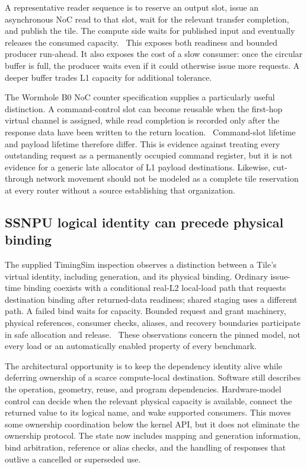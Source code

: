 A representative reader sequence is to reserve an output slot, issue an asynchronous NoC read to that slot, wait for the relevant transfer completion, and publish the tile. The compute side waits for published input and eventually releases the consumed capacity.~\citep{u001-metalium} This exposes both readiness and bounded producer run-ahead. It also exposes the cost of a slow consumer: once the circular buffer is full, the producer waits even if it could otherwise issue more requests. A deeper buffer trades L1 capacity for additional tolerance.

The Wormhole B0 NoC counter specification supplies a particularly useful distinction. A command-control slot can become reusable when the first-hop virtual channel is assigned, while read completion is recorded only after the response data have been written to the return location.~\citep{u002-tt-counters} Command-slot lifetime and payload lifetime therefore differ. This is evidence against treating every outstanding request as a permanently occupied command register, but it is not evidence for a generic late allocator of L1 payload destinations. Likewise, cut-through network movement should not be modeled as a complete tile reservation at every router without a source establishing that organization.

\subsection{SSNPU logical identity can precede physical binding}

The supplied TimingSim inspection observes a distinction between a Tile's virtual identity, including generation, and its physical binding. Ordinary issue-time binding coexists with a conditional real-L2 local-load path that requests destination binding after returned-data readiness; shared staging uses a different path. A failed bind waits for capacity. Bounded request and grant machinery, physical references, consumer checks, aliases, and recovery boundaries participate in safe allocation and release.~\citep{u001-ssnpu-audit} These observations concern the pinned model, not every load or an automatically enabled property of every benchmark.

The architectural opportunity is to keep the dependency identity alive while deferring ownership of a scarce compute-local destination. Software still describes the operation, geometry, reuse, and program dependencies. Hardware-model control can decide when the relevant physical capacity is available, connect the returned value to its logical name, and wake supported consumers. This moves some ownership coordination below the kernel API, but it does not eliminate the ownership protocol. The state now includes mapping and generation information, bind arbitration, reference or alias checks, and the handling of responses that outlive a cancelled or superseded use.

